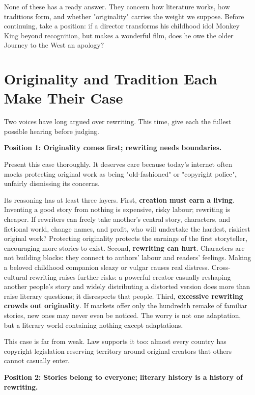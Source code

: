 None of these has a ready answer. They concern how literature works, how traditions form, and whether "originality" carries the weight we suppose. Before continuing, take a position: if a director transforms his childhood idol Monkey King beyond recognition, but makes a wonderful film, does he owe the older Journey to the West an apology?

\section[Originality and Tradition Make Their Cases]{Originality and Tradition Each Make Their Case}
Two voices have long argued over rewriting. This time, give each the fullest possible hearing before judging.

\textbf{Position 1: Originality comes first; rewriting needs boundaries.}

Present this case thoroughly. It deserves care because today's internet often mocks protecting original work as being "old-fashioned" or "copyright police", unfairly dismissing its concerns.

Its reasoning has at least three layers. First, \textbf{creation must earn a living}. Inventing a good story from nothing is expensive, risky labour; rewriting is cheaper. If rewriters can freely take another's central story, characters, and fictional world, change names, and profit, who will undertake the hardest, riskiest original work? Protecting originality protects the earnings of the first storyteller, encouraging more stories to exist. Second, \textbf{rewriting can hurt}. Characters are not building blocks: they connect to authors' labour and readers' feelings. Making a beloved childhood companion sleazy or vulgar causes real distress. Cross-cultural rewriting raises further risks: a powerful creator casually reshaping another people's story and widely distributing a distorted version does more than raise literary questions; it disrespects that people. Third, \textbf{excessive rewriting crowds out originality}. If markets offer only the hundredth remake of familiar stories, new ones may never even be noticed. The worry is not one adaptation, but a literary world containing nothing except adaptations.

This case is far from weak. Law supports it too: almost every country has copyright legislation reserving territory around original creators that others cannot casually enter.

\textbf{Position 2: Stories belong to everyone; literary history is a history of rewriting.}


